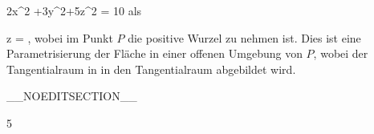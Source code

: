 {{\mavergleichskette
{\vergleichskette
{ 2x^2 +3y^2+5z^2
}
{ = }{ 10
}
{  }{
}
{    }{
}
{   }{
}
}
{}{}{}
als

\mavergleichskettedisp
{\vergleichskette
{ z
}
{ =} { \pm {}
}
{ } {
}
{ } {
}
{ } {
}
}
{}{}{,}
wobei im Punkt $P$ die positive Wurzel zu nehmen ist. Dies ist eine Parametrisierung der Fläche in einer offenen Umgebung von $P$, wobei der Tangentialraum in
 in den Tangentialraum
 abgebildet wird.
}

 }

__NOEDITSECTION__

{5}

